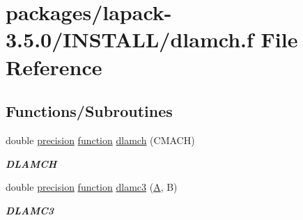 \hypertarget{dlamch_8f}{}\section{packages/lapack-\/3.5.0/\+I\+N\+S\+T\+A\+L\+L/dlamch.f File Reference}
\label{dlamch_8f}
\subsection*{Functions/\+Subroutines}
\begin{DoxyCompactItemize}
\item 
double \hyperlink{numinquire_8h_a2c8e616467665d0b2814d4c1589ba74e}{precision} \hyperlink{afunc_8m_a7b5e596df91eadea6c537c0825e894a7}{function} \hyperlink{group__auxOTHERauxiliary_ga06d6aa332f6f66e062e9b96a41f40800}{dlamch} (C\+M\+A\+C\+H)
\begin{DoxyCompactList}\small\item\em {\bfseries D\+L\+A\+M\+C\+H} \end{DoxyCompactList}\item 
double \hyperlink{numinquire_8h_a2c8e616467665d0b2814d4c1589ba74e}{precision} \hyperlink{afunc_8m_a7b5e596df91eadea6c537c0825e894a7}{function} \hyperlink{group__auxOTHERauxiliary_gae762ae5fb996f7b2970c522d10fa22f2}{dlamc3} (\hyperlink{classA}{A}, B)
\begin{DoxyCompactList}\small\item\em {\bfseries D\+L\+A\+M\+C3} \end{DoxyCompactList}\end{DoxyCompactItemize}
